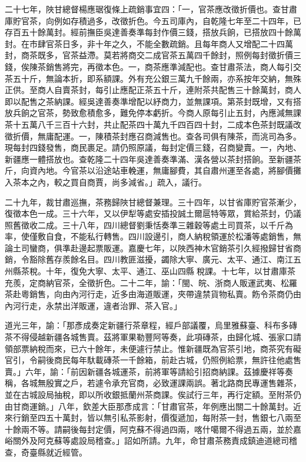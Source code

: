 \begin{pinyinscope}
二十七年，陜甘總督楊應琚復條上疏銷事宜四：「一，官茶應改徵折價也。查甘肅庫貯官茶，向例如存積過多，改徵折色。今五司庫內，自乾隆七年至二十四年，已存百五十餘萬封。經前撫臣吳達善奏準每封作價三錢，搭放兵餉，已搭放四十餘萬封。在市肆官茶日多，非十年之久，不能全數疏銷。且每年商人又增配二十四萬封，商茶既多，官茶益滯。莫若將商交二成官茶五萬四千餘封，照例每封徵折價三錢，俟陳茶銷售將完，再徵本色。一，商茶應準減配也。查甘肅茶法，商人每引交茶五十斤，無論本折，即系額課。外有充公銀三萬九千餘兩，亦系按年交納，無殊正供。至商人自賣茶封，每引止應配正茶五十斤，連附茶共配售三十餘萬封，商人即以配售之茶納課。經吳達善奏準增配以紓商力，並無課項。第茶封既增，又有搭放兵餉之官茶，勢致愈積愈多，難免停本虧折。今商人原每引止五封，內應減無課茶十五萬八千三百十六封，共止配茶四十萬九千四百四十封，二成本色茶封既議改徵折價，無庸配運。一，陳積茶封應召商減售也。查各司俱有陳茶，而洮司為多。現每封四錢發售，商民裹足。請仍照原議，每封定價三錢，召商變賣。一，內地、新疆應一體搭放也。查乾隆二十四年吳達善奏準滿、漢各營以茶封搭餉。至新疆茶斤，向資內地。今官茶以沿途站車輓運，無庸腳費，其自肅州運至各處，將腳價攤入茶本之內，較之買自商賈，尚多減省。」疏入，議行。

二十九年，裁甘肅巡撫，茶務歸陜甘總督兼理。三十四年，以甘省庫貯官茶漸少，復徵本色一成。三十六年，又以伊犁等處安插投誠土爾扈特等眾，賞給茶封，仍議照舊徵收二成。三十八年，四川總督劉秉恬奏準三雜穀等處土司買茶，以千斤為率，使僅敷自食，不能私行轉售。四川設邊引，商人納稅領運於松潘等處銷售，無論土司蠻商，俱準赴邊起票販運。嘉慶七年，以陜西神木官銷茶引久經撥歸甘省商銷，令豁除舊存羨餘名目。四川教匪滋擾，蠲除大寧、廣元、太平、通江、南江五州縣茶稅。十年，復免大寧、太平、通江、巫山四縣稅課。十七年，以甘肅庫茶充羨，定商納官茶，全徵折色。二十二年，諭：「閩、皖、浙商人販運武夷、松羅茶赴粵銷售，向由內河行走，近多由海道販運，夾帶違禁貨物私賣。飭令茶商仍由內河行走，永禁出洋販運，違者治罪、茶入官。」

道光三年，諭：「那彥成奏定新疆行茶章程，經戶部議覆，烏里雅蘇臺、科布多磚茶不得侵越新疆各城售賣。茲將軍果勒豐阿等奏，此項磚茶，由歸化城、張家口請領部票納稅而來，已六十餘年，未便遽行禁止。惟新疆既為官茶引地，商茶究有礙官引，令嗣後商民每年馱載磚茶一千餘箱，前赴古城，仍照例給票，無許往他處售賣。」六年，諭：「前因新疆各城運茶，前將軍等請給引招商納課。茲據慶祥等奏稱，各城無殷實之戶，若遽令承充官商，必致運課兩誤。著北路商民專運售雜茶，並在古城設局抽稅，即以所收銀抵蘭州茶商課。俟試行三年，再行定額。至附茶仍由甘商運銷。」八年，欽差大臣那彥成言：「甘肅官茶，年例應出關二十餘萬封。近來行銷至四五十萬封，皆以無引私茶影射，價復遞加，每附茶一封，售銀七八兩至十餘兩不等。請嗣後每封定價，阿克蘇不得過四兩，喀什噶爾不得過五兩，並於嘉峪關外及阿克蘇等處設局稽查。」詔如所請。九年，命甘肅茶務責成鎮迪道總司稽查，奇臺縣就近經管。


\end{pinyinscope}
